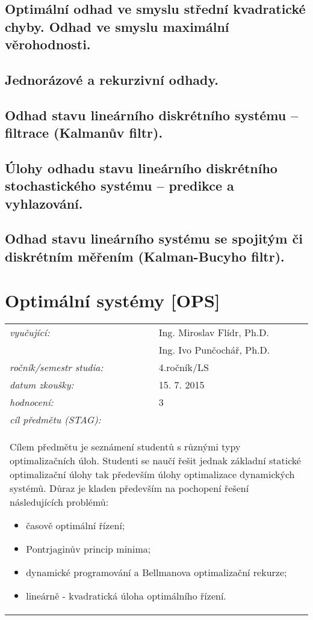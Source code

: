 \subsection{Optimální odhad ve smyslu střední kvadratické chyby. Odhad ve smyslu maximální věrohodnosti.}

\subsection{Jednorázové a rekurzivní odhady.}

\subsection{Odhad stavu lineárního diskrétního systému – filtrace (Kalmanův filtr).}

\subsection{Úlohy odhadu stavu lineárního diskrétního stochastického systému – predikce a vyhlazování.}

\subsection{Odhad stavu lineárního systému se spojitým či diskrétním měřením (Kalman-Bucyho filtr).}

\section{Optimální systémy [OPS]}

\begin{table}[H]
\centering
\begin{tabular}{p{4cm} p{12cm}}
\textit{vyučující:}             & Ing. Miroslav Flídr, Ph.D. \\
								 & Ing. Ivo Punčochář, Ph.D. \\
\textit{ročník/semestr studia:} & 4.ročník/LS \\
\textit{datum zkoušky:}         & 15. 7. 2015 \\
\textit{hodnocení:}             & 3 \\
\textit{cíl předmětu (STAG):}   & \\
\multicolumn{2}{p{16cm}}{Cílem předmětu je seznámení studentů s různými typy optimalizačních úloh. Studenti se naučí řešit jednak základní statické optimalizační úlohy tak především úlohy optimalizace dynamických systémů. Důraz je kladen především na pochopení řešení následujících problémů: 
\begin{itemize}
\item časově optimální řízení;
\item Pontrjaginův princip minima;
\item dynamické programování a Bellmanova optimalizační rekurze;
\item lineárně - kvadratická úloha optimálního řízení.
\end{itemize}}
\end{tabular}
\end{table}

